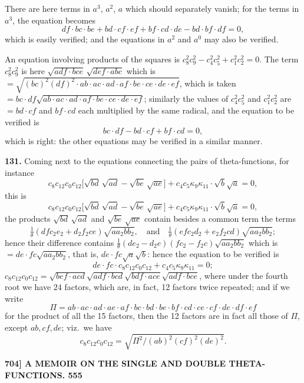 \documentclass[11pt]{article}
\begin{document}
There are here terms in $a^3$, $a^2$, $a$ which should separately vanish; for the terms in $a^3$, the equation becomes
\[
df\cdot bc\cdot be + bd\cdot cf\cdot ef + bf\cdot cd\cdot de - bd\cdot bf\cdot df = 0,
\]
which is easily verified; and the equations in $a^2$ and $a^0$ may also be verified.

\medskip
An equation involving products of the squares is $c_8^2c_9^2 - c_4^2c_5^2 + c_1^2c_2^2 = 0$. The term $c_8^2c_9^2$ is here $\sqrt{adf\cdot bce}\,\sqrt{def\cdot abc}$ which is $= \sqrt{(bc)^2(df)^2\cdot ab\cdot ac\cdot ad\cdot af\cdot be\cdot ce\cdot de\cdot ef}$, which is taken $= bc\cdot df\sqrt{ab\cdot ac\cdot ad\cdot af\cdot be\cdot ce\cdot de\cdot ef}$; similarly the values of $c_4^2c_5^2$ and $c_1^2c_2^2$ are $= bd\cdot cf$ and $bf\cdot cd$ each multiplied by the same radical, and the equation to be verified is
\[
bc\cdot df - bd\cdot cf + bf\cdot cd = 0,
\]
which is right: the other equations may be verified in a similar manner.

\medskip
\textbf{131.} Coming next to the equations connecting the pairs of theta-functions, for instance
\[
c_8c_{12}c_0c_{12}\bigl[\sqrt{bd}\,\sqrt{ad} - \sqrt{be}\,\sqrt{ae}\bigr] + c_4c_5\kappa_9\kappa_{11}\cdot\sqrt{b}\sqrt{a} = 0,
\]
this is
\[
c_8c_{12}c_0c_{12}\bigl[\sqrt{bd}\,\sqrt{ad} - \sqrt{be}\,\sqrt{ae}\bigr] + c_4c_5\kappa_9\kappa_{11}\cdot\sqrt{b}\sqrt{a} = 0,
\]
the products $\sqrt{bd}\,\sqrt{ad}$ and $\sqrt{be}\,\sqrt{ae}$ contain besides a common term the terms
\[
\tfrac{1}{\theta}(dfc_2e_2 + d_2f_2ce)\sqrt{aa_2bb_2},\quad\text{and}\quad \tfrac{1}{\theta}(efc_2d_2 + e_2f_2cd)\sqrt{aa_2bb_2};
\]
hence their difference contains $\tfrac{1}{\theta}(de_2 - d_2e)(fc_2 - f_2c)\sqrt{aa_2bb_2}$ which is $= de\cdot fc\sqrt{aa_2bb_2}$, that is, $de\cdot fc\sqrt{a}\sqrt{b}$: hence the equation to be verified is
\[
de\cdot fc\cdot c_8c_{12}c_0c_{12} + c_4c_5\kappa_9\kappa_{11} = 0;
\]
$c_8c_{12}c_0c_{12} = \sqrt{bef\cdot acd}\sqrt{adf\cdot bcd}\sqrt{bdf\cdot ace}\sqrt{adf\cdot bce}$, where under the fourth root we have $24$ factors, which are, in fact, 12 factors twice repeated; and if we write
\[
\Pi = ab\cdot ac\cdot ad\cdot ae\cdot af\cdot bc\cdot bd\cdot be\cdot bf\cdot cd\cdot ce\cdot cf\cdot de\cdot df\cdot ef
\]
for the product of all the 15 factors, then the 12 factors are in fact all those of $\Pi$, except $ab, cf, de$; viz.\ we have
\[
c_8c_{12}c_0c_{12} = \sqrt{\Pi^2 / (ab)^2(cf)^2(de)^2}.
\]

\newpage
\noindent\textbf{704] \quad A MEMOIR ON THE SINGLE AND DOUBLE THETA-FUNCTIONS. \hfill 555}
\end{document}
